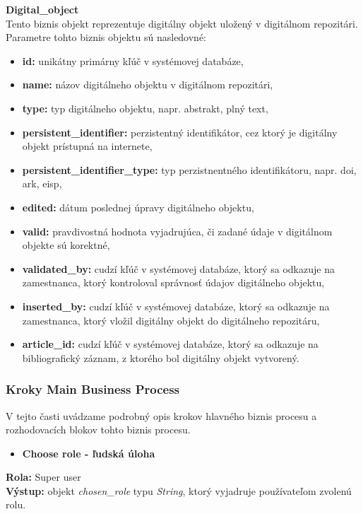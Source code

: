 \documentclass[10pt,oneside,slovak,a4paper]{article}
\begin{document}
\textbf{Digital\_object}\\
Tento biznis objekt reprezentuje digitálny objekt uložený v digitálnom repozitári. Parametre tohto biznis objektu sú nasledovné:

\begin{itemize}
\item \textbf{id:} unikátny primárny kľúč v systémovej databáze,
\item \textbf{name:} názov digitálneho objektu v digitálnom repozitári,
\item \textbf{type:} typ digitálneho objektu, napr. abstrakt, plný text,
\item \textbf{persistent\_identifier:} perzistentný identifikátor, cez ktorý je digitálny objekt prístupná na internete,
\item \textbf{persistent\_identifier\_type:} typ perzistnentného identifikátoru, napr. doi, ark, eisp,
\item \textbf{edited:} dátum poslednej úpravy digitálneho objektu,
\item \textbf{valid:} pravdivostná hodnota vyjadrujúca, či zadané údaje v digitálnom objekte sú korektné,
\item \textbf{validated\_by:} cudzí kľúč v systémovej databáze, ktorý sa odkazuje na zamestnanca, ktorý kontroloval správnosť údajov digitálneho objektu,
\item \textbf{inserted\_by:} cudzí kľúč v systémovej databáze, ktorý sa odkazuje na zamestnanca, ktorý vložil digitálny objekt do digitálneho repozitáru,
\item \textbf{article\_id:} cudzí kľúč v systémovej databáze, ktorý sa odkazuje na bibliografický záznam, z ktorého bol digitálny objekt vytvorený.
\end{itemize}

\subsubsection{Kroky Main Business Process}
V tejto časti uvádzame podrobný opis krokov hlavného biznis procesu a rozhodovacích blokov tohto biznis procesu.

\begin{itemize}
\item \textbf{Choose role - ľudská úloha}
\end{itemize}

\textbf{Rola:} Super user\\
\textbf{Výstup:} objekt \textit{chosen\_role} typu \textit{String}, ktorý vyjadruje používateľom zvolenú rolu.
\end{document}
